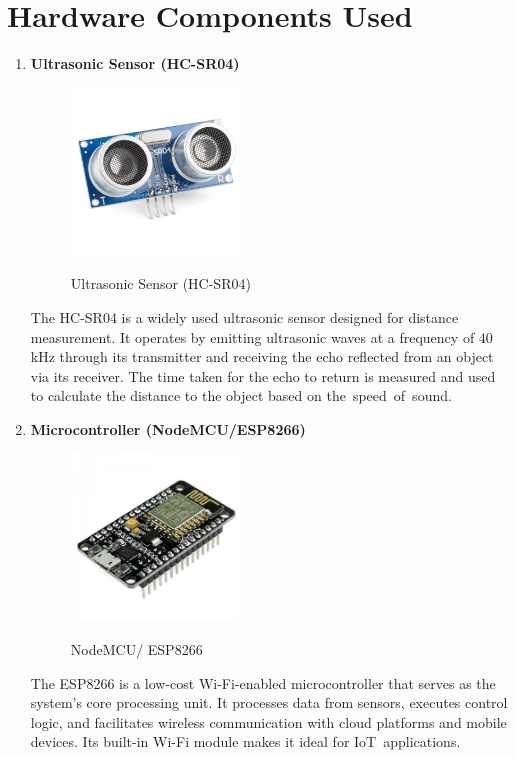 {\section{Hardware Components Used}
\begin{enumerate}
    \item \textbf{Ultrasonic Sensor (HC-SR04)}\\
        \begin{figure}[H]
            \centering
            \includegraphics[width=1.75in]{ultrasonic.jpg} \\
            \caption{Ultrasonic Sensor (HC-SR04)}
            \label{fig:ultrasonic} %
        \end{figure}
    The HC-SR04 is a widely used ultrasonic sensor designed for distance measurement. It operates by emitting ultrasonic waves at a frequency of 40 kHz through its transmitter and receiving the echo reflected from an object via its receiver. The time taken for the echo to return is measured and used to calculate the distance to the object based on the speed of sound.
    
    \item \textbf{Microcontroller (NodeMCU/ESP8266)}\\
    \begin{figure}[H]
            \centering
            \includegraphics[width=1.75in]{esp.jpg} \\
            \caption{NodeMCU/ ESP8266}
            \label{fig:esp} %
        \end{figure}
    The ESP8266 is a low-cost Wi-Fi-enabled microcontroller that serves as the system's core processing unit. It processes data from sensors, executes control logic, and facilitates wireless communication with cloud platforms and mobile devices. Its built-in Wi-Fi module makes it ideal for IoT applications.


\end{enumerate}}
